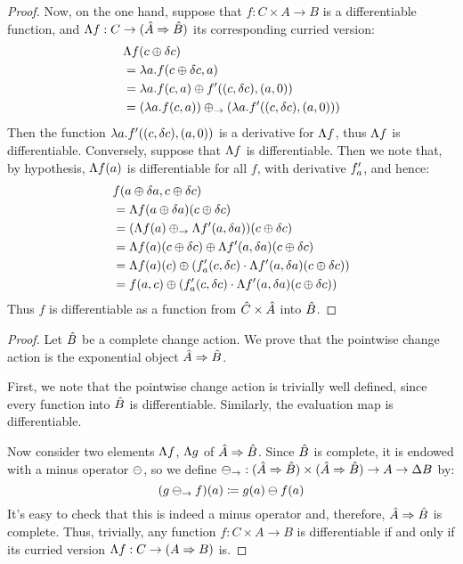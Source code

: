 \begin{proof}
  Now, on the one hand, suppose that $f : C \times A \rightarrow B$ is a differentiable function,
  and $\Lambda{f} : C \rightarrow ({\hat{A}} \Rightarrow {\hat{B}})$ its corresponding curried version:
  \begin{align*}
    &\Lambda{f}(c \oplus \delta c)\\
    &= \lambda a . f(c \oplus \delta c, a)\\
    &= \lambda a . f(c, a) \oplus f'((c, \delta c), (a, 0))\\
    &= (\lambda a . f(c, a)) \oplus_\rightarrow (\lambda a . f'((c, \delta c), (a, 0)))
  \end{align*}
  Then the function $\lambda a . f'((c, \delta c), (a, 0))$ is a derivative for $\Lambda{f}$,
  thus $\Lambda{f}$ is differentiable. Conversely, suppose that $\Lambda{f}$ is differentiable.
  Then we note that, by hypothesis, $\Lambda{f}(a)$ is differentiable for all $f$, with derivative
  $f_a'$, and hence:
  \begin{align*}
    &f(a \oplus \delta a, c \oplus \delta c)\\
    &= \Lambda{f}(a \oplus \delta a)(c \oplus \delta c)\\
    &= (\Lambda{f}(a) \oplus_\rightarrow \Lambda{f}'(a, \delta a))(c \oplus \delta c)\\
    &= \Lambda{f}(a)(c \oplus \delta c) \oplus \Lambda{f}'(a, \delta a)(c\oplus\delta c)\\
    &= \Lambda{f}(a)(c) \oplus (f_a'(c, \delta c) \cdot \Lambda{f}'(a, \delta a)(c\oplus\delta c))\\
    &= f(a, c) \oplus (f_a'(c, \delta c) \cdot \Lambda{f}'(a, \delta a)(c\oplus\delta c))
  \end{align*}
  Thus $f$ is differentiable as a function from $\hat{C} \times \hat{A}$ into $\hat{B}$.
\end{proof}

\pointwiseComplete*
\begin{proof}
\label{prf:pointwiseComplete}
  Let $\hat{B}$ be a complete change action.
  We prove that the pointwise change action is the exponential object ${\hat{A}} \Rightarrow {\hat{B}}$.

  First, we note that the pointwise change action is trivially well defined, since
  every function into $\hat{B}$ is differentiable. Similarly, the evaluation map
  is differentiable.

  Now consider two elements $\Lambda{f}$, $\Lambda{g}$ of ${\hat{A}} \Rightarrow {\hat{B}}$. Since
  $\hat{B}$ is complete, it is endowed with a minus operator $\ominus$, so we define
  $\ominus_\rightarrow : ({\hat{A}} \Rightarrow {\hat{B}}) \times ({\hat{A}} \Rightarrow {\hat{B}}) \rightarrow A \rightarrow \Delta B$ by:
  $$ (g \ominus_\rightarrow f)(a) \coloneqq g(a) \ominus f(a) $$
  It's easy to check that this is indeed a minus operator and, therefore, ${\hat{A}} \Rightarrow {\hat{B}}$
  is complete. Thus, trivially, any function $f : C \times A \rightarrow B$ is differentiable
  if and only if its curried version $\Lambda{f} : C \rightarrow ({A} \Rightarrow {B})$ is.
\end{proof}

